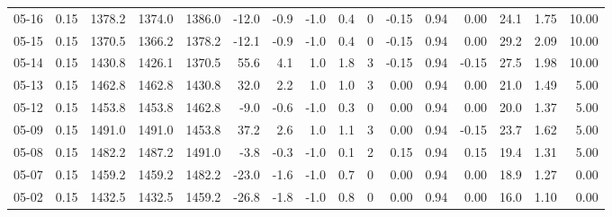 \begin{threeparttable}
{\begin{tabular}{lrrrrrrrrrrrrrrr}
  05-16 &     0.15 & 1378.2 & 1374.0 & 1386.0 &      -12.0 &           -0.9 &                     -1.0 &                 0.4 &              0 &      -0.15 &      0.94 &           0.00 &             24.1 &            1.75 &                  10.00 \\
  05-15 &     0.15 & 1370.5 & 1366.2 & 1378.2 &      -12.1 &           -0.9 &                     -1.0 &                 0.4 &              0 &      -0.15 &      0.94 &           0.00 &             29.2 &            2.09 &                  10.00 \\
  05-14 &     0.15 & 1430.8 & 1426.1 & 1370.5 &       55.6 &            4.1 &                      1.0 &                 1.8 &              3 &      -0.15 &      0.94 &          -0.15 &             27.5 &            1.98 &                  10.00 \\
  05-13 &     0.15 & 1462.8 & 1462.8 & 1430.8 &       32.0 &            2.2 &                      1.0 &                 1.0 &              3 &       0.00 &      0.94 &           0.00 &             21.0 &            1.49 &                   5.00 \\
  05-12 &     0.15 & 1453.8 & 1453.8 & 1462.8 &       -9.0 &           -0.6 &                     -1.0 &                 0.3 &              0 &       0.00 &      0.94 &           0.00 &             20.0 &            1.37 &                   5.00 \\
  05-09 &     0.15 & 1491.0 & 1491.0 & 1453.8 &       37.2 &            2.6 &                      1.0 &                 1.1 &              3 &       0.00 &      0.94 &          -0.15 &             23.7 &            1.62 &                   5.00 \\
  05-08 &     0.15 & 1482.2 & 1487.2 & 1491.0 &       -3.8 &           -0.3 &                     -1.0 &                 0.1 &              2 &       0.15 &      0.94 &           0.15 &             19.4 &            1.31 &                   5.00 \\
  05-07 &     0.15 & 1459.2 & 1459.2 & 1482.2 &      -23.0 &           -1.6 &                     -1.0 &                 0.7 &              0 &       0.00 &      0.94 &           0.00 &             18.9 &            1.27 &                   0.00 \\
  05-02 &     0.15 & 1432.5 & 1432.5 & 1459.2 &      -26.8 &           -1.8 &                     -1.0 &                 0.8 &              0 &       0.00 &      0.94 &           0.00 &             16.0 &            1.10 &                   0.00 \\

\end{tabular}}
\end{threeparttable}
